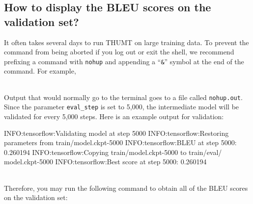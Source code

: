 \documentclass{article}
\begin{document}
\subsection{How to display the BLEU scores on the validation set?}
It often takes several days to run THUMT on large training data. To prevent the command from being aborted if you log out or exit the shell, we recommend prefixing a command with \verb|nohup| and appending a ``\verb|&|'' symbol at the end of the command. For example,
\\
\\
Output that would normally go to the terminal goes to a file called \verb|nohup.out|. Since the parameter \verb|eval_step| is set to 5,000, the intermediate model will be validated for every 5,000 steps. Here is an example output for validation:
\\
\begin{everbatim}
INFO:tensorflow:Validating model at step 5000
INFO:tensorflow:Restoring parameters from train/model.ckpt-5000
INFO:tensorflow:BLEU at step 5000: 0.260194
INFO:tensorflow:Copying train/model.ckpt-5000 to train/eval/
model.ckpt-5000
INFO:tensorflow:Best score at step 5000: 0.260194
\end{everbatim}
\\
Therefore, you may run the following command to obtain all of the BLEU scores on the validation set:
\\
\end{document}

